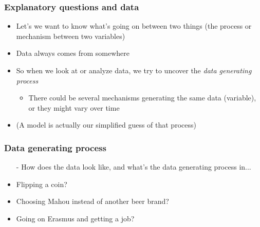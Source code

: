 \documentclass[aspectratio=43]{beamer}
\begin{document}
\begin{frame}
\frametitle{Explanatory questions and data}
\centering

\begin{itemize}
  \item Let's we want to know what's going on between two things (the process or mechanism between two variables)
  \item Data always comes from somewhere
  \item So when we look at or analyze data, we try to uncover the \textit{data generating process}
  \begin{itemize}
    \item There could be several mechanisms generating the same data (variable), or they might vary over time
  \end{itemize}
  \item (A model is actually our simplified guess of that process)
\end{itemize}

\end{frame}

\begin{frame}
\frametitle{Data generating process}
\centering

\begin{itemize}
  \item[-] How does the data look like, and what's the data generating process in...
  \item[]
  \item Flipping a coin?
  \item Choosing Mahou instead of another beer brand?
  \item Going on Erasmus and getting a job?
\end{itemize}

\end{frame}
\end{document}
